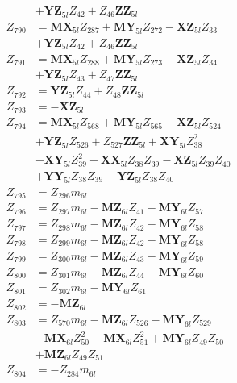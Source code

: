 \begin{multicols}{2}
\begin{align}
&+ \mathbf{YZ}_{5l}Z_{42} + Z_{46}\mathbf{ZZ}_{5l} \nonumber \\
Z_{790} &= \mathbf{MX}_{5l}Z_{287} + \mathbf{MY}_{5l}Z_{272} - \mathbf{XZ}_{5l}Z_{33}  \nonumber \\
&+ \mathbf{YZ}_{5l}Z_{42} + Z_{46}\mathbf{ZZ}_{5l} \nonumber \\
Z_{791} &= \mathbf{MX}_{5l}Z_{288} + \mathbf{MY}_{5l}Z_{273} - \mathbf{XZ}_{5l}Z_{34}  \nonumber \\
&+ \mathbf{YZ}_{5l}Z_{43} + Z_{47}\mathbf{ZZ}_{5l} \nonumber \\
Z_{792} &= \mathbf{YZ}_{5l}Z_{44} + Z_{48}\mathbf{ZZ}_{5l} \nonumber \\
Z_{793} &= -\mathbf{XZ}_{5l} \nonumber \\
Z_{794} &= \mathbf{MX}_{5l}Z_{568} + \mathbf{MY}_{5l}Z_{565} - \mathbf{XZ}_{5l}Z_{524}  \nonumber \\
&+ \mathbf{YZ}_{5l}Z_{526} + Z_{527}\mathbf{ZZ}_{5l} + \mathbf{XY}_{5l}Z_{38}^2  \nonumber \\
&- \mathbf{XY}_{5l}Z_{39}^2 - \mathbf{XX}_{5l}Z_{38}Z_{39} - \mathbf{XZ}_{5l}Z_{39}Z_{40}  \nonumber \\
&+ \mathbf{YY}_{5l}Z_{38}Z_{39} + \mathbf{YZ}_{5l}Z_{38}Z_{40} \nonumber \\
Z_{795} &= Z_{296}m_{6l} \nonumber \\
Z_{796} &= Z_{297}m_{6l} - \mathbf{MZ}_{6l}Z_{41} - \mathbf{MY}_{6l}Z_{57} \nonumber \\
Z_{797} &= Z_{298}m_{6l} - \mathbf{MZ}_{6l}Z_{42} - \mathbf{MY}_{6l}Z_{58} \nonumber \\
Z_{798} &= Z_{299}m_{6l} - \mathbf{MZ}_{6l}Z_{42} - \mathbf{MY}_{6l}Z_{58} \nonumber \\
Z_{799} &= Z_{300}m_{6l} - \mathbf{MZ}_{6l}Z_{43} - \mathbf{MY}_{6l}Z_{59} \nonumber \\
Z_{800} &= Z_{301}m_{6l} - \mathbf{MZ}_{6l}Z_{44} - \mathbf{MY}_{6l}Z_{60} \nonumber \\
Z_{801} &= Z_{302}m_{6l} - \mathbf{MY}_{6l}Z_{61} \nonumber \\
Z_{802} &= -\mathbf{MZ}_{6l} \nonumber \\
Z_{803} &= Z_{570}m_{6l} - \mathbf{MZ}_{6l}Z_{526} - \mathbf{MY}_{6l}Z_{529}  \nonumber \\
&- \mathbf{MX}_{6l}Z_{50}^2 - \mathbf{MX}_{6l}Z_{51}^2 + \mathbf{MY}_{6l}Z_{49}Z_{50}  \nonumber \\
&+ \mathbf{MZ}_{6l}Z_{49}Z_{51} \nonumber \\
Z_{804} &= -Z_{284}m_{6l} \nonumber \\

\end{align}
\end{multicols}
